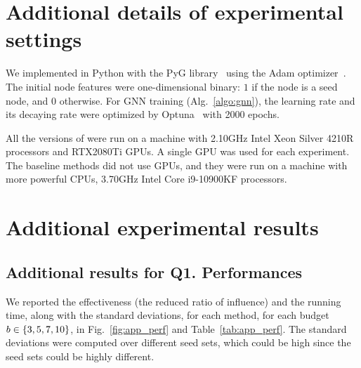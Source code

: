 \section{Additional details of experimental settings}\label{sec:app_setting}

\smallsection{\method}
We implemented \method in Python with the PyG library~\citep{fey2019fast} using the Adam optimizer~\cite{kingma2014adam}.
The initial node features were one-dimensional binary: $1$ if the node is a seed node, and $0$ otherwise.
For GNN training (Alg.~\ref{algo:gnn}), the learning rate and its decaying rate were optimized by Optuna~\cite{optuna_2019} with 2000 epochs.

All the versions of \method were run on a machine with 
2.10GHz Intel\textsuperscript{\textregistered} Xeon\textsuperscript{\textregistered} Silver 4210R processors and RTX2080Ti GPUs.
A single GPU was used for each experiment.
The baseline methods did not use GPUs, and they were run on a machine with more powerful CPUs, 3.70GHz Intel\textsuperscript{\textregistered} Core\textsuperscript{\texttrademark} i9-10900KF processors.

\section{Additional experimental results}\label{sec:app_exp}

\subsection{Additional results for Q1. Performances}\label{sec:app_perf}
We reported the effectiveness (the reduced ratio of influence) and the running time, along with the standard deviations, for each method, for each budget $b \in \{3,5,7,10\}$, in Fig.~\ref{fig:app_perf} and Table~\ref{tab:app_perf}.
The standard deviations were computed over different seed sets, which could be high since the seed sets could be highly different. 


